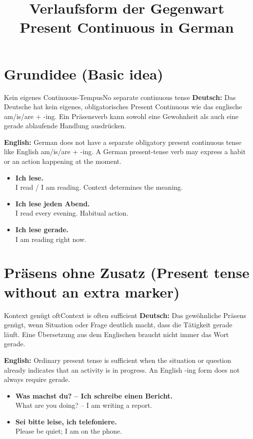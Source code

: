 \documentclass[a4paper,11pt]{article}
\title{Verlaufsform der Gegenwart\\\large\textnormal{Present Continuous in German}}
\date{}
\newcommand{\GermanText}[1]{\textbf{Deutsch: }#1\par}
\newcommand{\EnglishText}[1]{{\small\color{SoftGray}\textbf{English: }#1\par}}
\newcommand{\ExampleItem}[2]{\item \textbf{#1}\\{\small\color{SoftGray}#2}}
\begin{document}
\maketitle
\tableofcontents
\newpage

\section{Grundidee \textnormal{(Basic idea)}}
\begin{grammarentry}{Kein eigenes Continuous-Tempus}{No separate continuous tense}
\GermanText{Das Deutsche hat kein eigenes, obligatorisches Present Continuous wie das englische am/is/are + -ing. Ein Präsensverb kann sowohl eine Gewohnheit als auch eine gerade ablaufende Handlung ausdrücken.}
\EnglishText{German does not have a separate obligatory present continuous tense like English am/is/are + -ing. A German present-tense verb may express a habit or an action happening at the moment.}
\end{grammarentry}
\begin{exbox}
\begin{itemize}
\ExampleItem{Ich lese.}{I read / I am reading. Context determines the meaning.}
\ExampleItem{Ich lese jeden Abend.}{I read every evening. Habitual action.}
\ExampleItem{Ich lese gerade.}{I am reading right now.}
\end{itemize}
\end{exbox}

\section{Präsens ohne Zusatz \textnormal{(Present tense without an extra marker)}}
\begin{grammarentry}{Kontext genügt oft}{Context is often sufficient}
\GermanText{Das gewöhnliche Präsens genügt, wenn Situation oder Frage deutlich macht, dass die Tätigkeit gerade läuft. Eine Übersetzung aus dem Englischen braucht nicht immer das Wort gerade.}
\EnglishText{Ordinary present tense is sufficient when the situation or question already indicates that an activity is in progress. An English -ing form does not always require gerade.}
\end{grammarentry}
\begin{exbox}
\begin{itemize}
\ExampleItem{Was machst du? -- Ich schreibe einen Bericht.}{What are you doing? -- I am writing a report.}
\ExampleItem{Sei bitte leise, ich telefoniere.}{Please be quiet; I am on the phone.}
\end{itemize}
\end{exbox}
\end{document}
